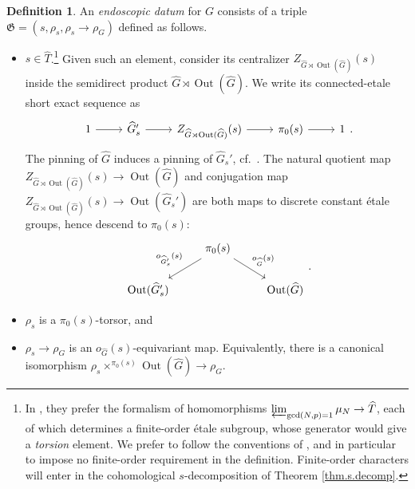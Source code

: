 \documentclass[openany]{amsbook}
\theoremstyle{definition}
\newtheorem{definition}[theorem]{Definition}
\theoremstyle{remark}
\numberwithin{equation}{section}
\renewcommand{\-}{\operatorname{-}}
\newcommand{\Out}{\operatorname{Out}}
\newcommand{\fG}{\mathfrak{G}}
\begin{document}
\begin{definition}\label{def.end.datum}
    An \textit{endoscopic datum} for $G$ consists of a triple $\fG = (s, \rho_s, \rho_{s} \to \rho_G)$ defined as follows.
    \begin{itemize}
        \item $s \in \widehat{T}$.\footnote{In \cite{geostabpadic}, they prefer the formalism of homomorphisms $\varprojlim_{\gcd(N,p) = 1} \mu_N \to \widehat{T}$, each of which determines a finite-order \'etale subgroup, whose generator would give a \emph{torsion} element. We prefer to follow the conventions of \cite{ngofl, CLII}, and in particular to impose no finite-order requirement in the definition. Finite-order characters will enter in the cohomological $s$-decomposition of Theorem \ref{thm.s.decomp}.} Given such an element, consider its centralizer $Z_{\widehat{G} \rtimes \Out(\widehat{G})}(s)$ inside the semidirect product $\widehat{G} \rtimes \Out(\widehat{G})$. We write its connected-etale short exact sequence as
        \begin{equation}
        \begin{tikzcd}[ampersand replacement=\&]
                1 \ar[r] \& \widehat{G}_{s}' \ar[r] \& Z_{\widehat{G} \rtimes \Out(\widehat{G})}(s) \ar[r] \& \pi_0(s) \ar[r] \& 1
        \end{tikzcd}.\label{eqn.end.ses}
        \end{equation}
        The pinning of $\widehat{G}$ induces a pinning of $\widehat{G}_{s}'$, cf.\ \cite[Lemma 4.4]{geostabpadic}. 
        The natural quotient map $Z_{\widehat{G} \rtimes \Out(\widehat{G})}(s) \to \Out(\widehat{G})$ and conjugation map  $Z_{\widehat{G} \rtimes \Out(\widehat{G})}(s) \to \Out(\widehat{G}_{s}')$ are both maps to discrete constant \'etale groups, hence descend to $\pi_{0}(s)$:
        \[
        \begin{tikzcd}[ampersand replacement=\&]
            \& \pi_0(s) \ar[dl, "o_{\widehat{G}_s'}(s)" above left] \ar[dr, "o_{\widehat{G}}(s)" above right] \& \\
            \Out(\widehat{G}_{s}') \& \& \Out(\widehat{G})
        \end{tikzcd}.
        \]
        \item $\rho_{s}$ is a $\pi_0(s)$-torsor, and 
        \item $\rho_{s} \to \rho_G$ is an $o_{\widehat{G}}(s)$-equivariant map. Equivalently, there is a canonical isomorphism $\rho_{s} \times^{\pi_0(s)} \Out(\widehat{G}) \to \rho_G$. 
    \end{itemize}
\end{definition}
\end{document}
